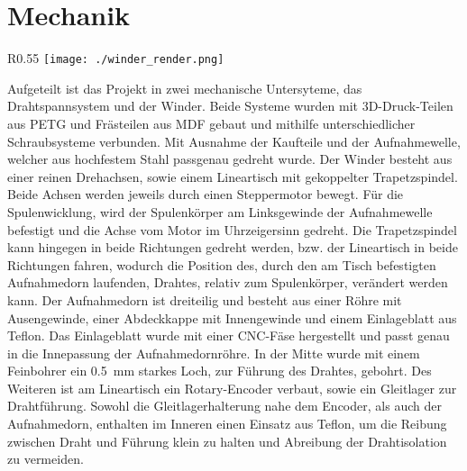 \section{Mechanik}
\label{sec:Mechanik}




\begin{wrapfigure}{R}{0.55\textwidth}
    \centering
    \texttt{[image: ./winder\_render.png]}
\end{wrapfigure}
Aufgeteilt ist das Projekt in zwei mechanische Untersyteme, das Drahtspannsystem und der Winder.
Beide Systeme wurden mit 3D-Druck-Teilen aus PETG und Frästeilen aus MDF gebaut und mithilfe unterschiedlicher Schraubsysteme verbunden. Mit Ausnahme der Kaufteile und der Aufnahmewelle, welcher aus hochfestem Stahl passgenau gedreht wurde.
\newline
Der Winder besteht aus einer reinen Drehachsen, sowie einem Lineartisch mit gekoppelter Trapetzspindel. Beide Achsen werden jeweils durch einen Steppermotor bewegt. Für die Spulenwicklung, wird der Spulenkörper am Linksgewinde der Aufnahmewelle befestigt und die Achse vom Motor im Uhrzeigersinn gedreht. Die Trapetzspindel kann hingegen in beide Richtungen gedreht werden, bzw. der Lineartisch in beide Richtungen fahren, wodurch die Position des, durch den am Tisch befestigten Aufnahmedorn laufenden, Drahtes, relativ zum Spulenkörper, verändert werden kann. Der Aufnahmedorn ist dreiteilig und besteht aus einer Röhre mit Ausengewinde, einer Abdeckkappe mit Innengewinde und einem Einlageblatt aus Teflon. Das Einlageblatt wurde mit einer CNC-Fäse hergestellt und passt genau in die Innepassung der Aufnahmedornröhre. In der Mitte wurde mit einem Feinbohrer ein 0.5~\si{\milli\metre} starkes Loch, zur Führung des Drahtes, gebohrt.
Des Weiteren ist am Lineartisch ein Rotary-Encoder verbaut, sowie ein Gleitlager zur Drahtführung. Sowohl die Gleitlagerhalterung nahe dem Encoder, als auch der Aufnahmedorn, enthalten im Inneren einen Einsatz aus Teflon, um die Reibung zwischen Draht und Führung klein zu halten und Abreibung der Drahtisolation zu vermeiden. \newline
